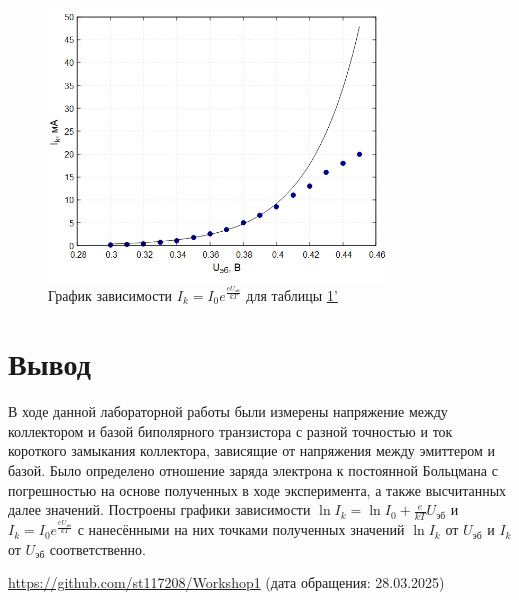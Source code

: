 \begin{figure}[H]
\centering
\includegraphics[width=0.8\textwidth]{Plot4.png}
\caption{График зависимости $I_k = I_0e^{\frac{eU_{\text{эб}}}{kT}}$ для таблицы \hyperref[tabl:2]{1'}}
\label{fig:plot4}
\end{figure}

\section{Вывод}
В ходе данной лабораторной работы были измерены напряжение между коллектором и базой биполярного транзистора с разной точностью и ток короткого замыкания коллектора, зависящие от напряжения между эмиттером и базой. Было определено отношение заряда электрона к постоянной Больцмана с погрешностью на основе полученных в ходе эксперимента, а также высчитанных далее значений. Построены графики зависимости $\ln I_k = \ln I_0 + \frac{e}{kT}U_{\text{эб}}$ и $I_k = I_0e^{\frac{eU_{\text{эб}}}{kT}}$ с нанесёнными на них точками полученных значений $\ln I_k$ от $U_{\text{эб}}$ и $I_k$ от $U_{\text{эб}}$ соответственно.

\begin{thebibliography}{9}
\url{https://github.com/st117208/Workshop1}  (дата обращения: 28.03.2025)
\end{thebibliography}